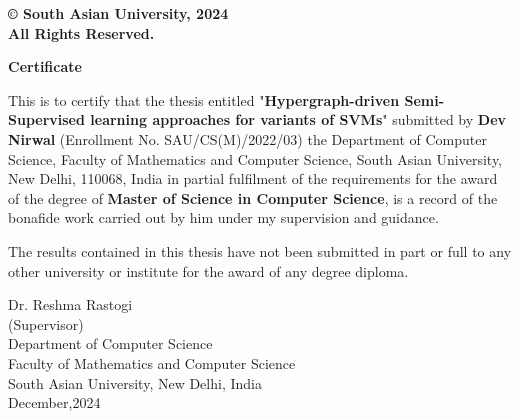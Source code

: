 \documentclass[12pt,a4paper,oneside,english]{report}
\begin{document}
\newpage
\thispagestyle{empty}
 \vspace*{4cm}
\vfill{}
\hspace{-0.8cm} \textbf{\copyright \hspace{0.1mm} South Asian University, 2024\\
	All Rights Reserved.}
\vspace{-2cm}

\newpage
\begin{center}
	\huge{\textbf{Certificate}}\\[1.5cm]
\end{center}
This is to certify that the thesis entitled "\textbf{Hypergraph-driven  Semi-Supervised learning approaches for variants of SVMs}" submitted by \textbf{Dev Nirwal} (Enrollment No. SAU/CS(M)/2022/03) the Department of Computer Science, Faculty of Mathematics and Computer Science, South Asian University, New Delhi, 110068, India in partial fulfilment of the requirements for the award of the degree of \textbf{Master of Science in Computer Science}, is a record of the bonafide work carried out by him under my supervision and guidance.\par

The results contained in this thesis have not been submitted in part or full to any other university or institute for the award of any degree diploma.


\vspace{1.9cm}

\begin{flushright} 
	Dr. Reshma Rastogi\\
	(Supervisor)\\
	Department of Computer Science\\
	Faculty of Mathematics and Computer Science\\
	South Asian University, New Delhi, India\\
	December,2024
\end{flushright} 
\end{document}
